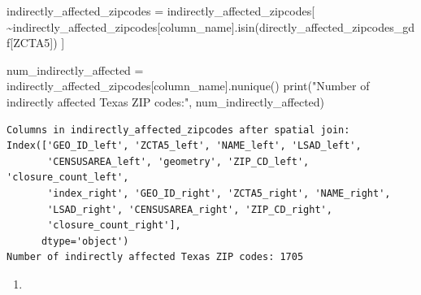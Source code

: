 \documentclass[
  letterpaper,
  DIV=11,
  numbers=noendperiod]{scrartcl}
\newenvironment{Shaded}{\begin{snugshade}}{\end{snugshade}}
\newcommand{\BuiltInTok}[1]{\textcolor[rgb]{0.00,0.23,0.31}{#1}}
\newcommand{\NormalTok}[1]{\textcolor[rgb]{0.00,0.23,0.31}{#1}}
\newcommand{\OperatorTok}[1]{\textcolor[rgb]{0.37,0.37,0.37}{#1}}
\newcommand{\StringTok}[1]{\textcolor[rgb]{0.13,0.47,0.30}{#1}}
\providecommand{\tightlist}{%
  \setlength{\itemsep}{0pt}\setlength{\parskip}{0pt}}\usepackage{longtable,booktabs,array}
\begin{document}
\begin{Shaded}
\begin{Highlighting}[]
\NormalTok{indirectly\_affected\_zipcodes }\OperatorTok{=}\NormalTok{ indirectly\_affected\_zipcodes[}
    \OperatorTok{\textasciitilde{}}\NormalTok{indirectly\_affected\_zipcodes[column\_name].isin(directly\_affected\_zipcodes\_gdf[}\StringTok{\textquotesingle{}ZCTA5\textquotesingle{}}\NormalTok{])}
\NormalTok{]}

\NormalTok{num\_indirectly\_affected }\OperatorTok{=}\NormalTok{ indirectly\_affected\_zipcodes[column\_name].nunique()}
\BuiltInTok{print}\NormalTok{(}\StringTok{"Number of indirectly affected Texas ZIP codes:"}\NormalTok{, num\_indirectly\_affected)}
\end{Highlighting}
\end{Shaded}

\begin{verbatim}
Columns in indirectly_affected_zipcodes after spatial join: Index(['GEO_ID_left', 'ZCTA5_left', 'NAME_left', 'LSAD_left',
       'CENSUSAREA_left', 'geometry', 'ZIP_CD_left', 'closure_count_left',
       'index_right', 'GEO_ID_right', 'ZCTA5_right', 'NAME_right',
       'LSAD_right', 'CENSUSAREA_right', 'ZIP_CD_right',
       'closure_count_right'],
      dtype='object')
Number of indirectly affected Texas ZIP codes: 1705
\end{verbatim}

\begin{enumerate}
\def\labelenumi{\arabic{enumi}.}
\setcounter{enumi}{3}
\tightlist
\item
\end{enumerate}
\end{document}
